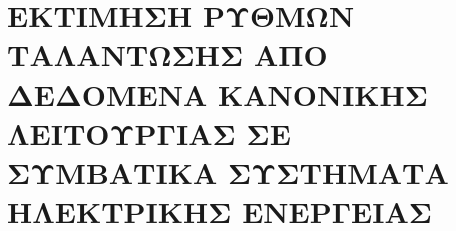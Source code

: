 \chapter{ΕΚΤΙΜΗΣΗ ΡΥΘΜΩΝ ΤΑΛΑΝΤΩΣΗΣ ΑΠΟ ΔΕΔΟΜΕΝΑ ΚΑΝΟΝΙΚΗΣ ΛΕΙΤΟΥΡΓΙΑΣ ΣΕ ΣΥΜΒΑΤΙΚΑ ΣΥΣΤΗΜΑΤΑ ΗΛΕΚΤΡΙΚΗΣ ΕΝΕΡΓΕΙΑΣ}
\label{chap:ambient-analysis}

\begingroup
\raggedbottom
\newcommand{\ambientfigurepath}{IEEE39/analysis/}
\let\ambientsection\section
\let\ambientsubsection\subsection
\renewcommand{\chapter}[1]{\ambientsection{#1}}
\renewcommand{\section}[1]{\ambientsubsection{#1}}
\renewcommand{\subsection}[1]{\subsubsection{#1}}




\endgroup
